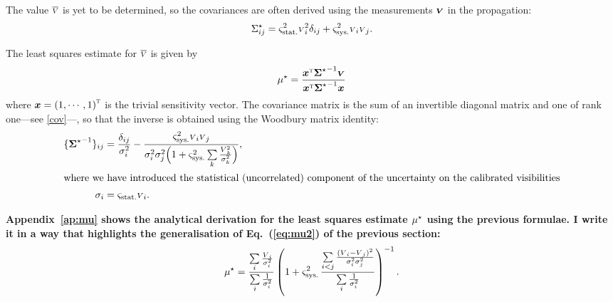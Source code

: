 \documentclass{pasa}
\def\correction#1{{\bfseries #1}}
\begin{document}
The value $\overline{{\scriptstyle V}}$ is yet to be determined, so the covariances are often derived using the measurements $\boldsymbol{{\scriptstyle V}}$ in the propagation:
\begin{equation}
    \Sigma_{ij}^\star = \varsigma_\text{stat.}^2 {\scriptstyle V}_i^2 \delta_{ij} 
            + \varsigma_\text{sys.}^2{\scriptstyle V}_i{\scriptstyle V}_j. \label{eq:cov}
\end{equation}

The least squares estimate for $\overline{{\scriptstyle V}}$ is given by
\begin{equation}
    \mu^\star =
                  \frac { {\boldsymbol{x}}^\text{\textsc{t}}{\ensuremath{\boldsymbol{\Sigma}}^\star}^{-1}\boldsymbol{{\scriptstyle V}} }
                        { {\boldsymbol{x}}^\text{\textsc{t}}{\ensuremath{\boldsymbol{\Sigma}}^\star}^{-1}\boldsymbol{x} }
    \label{eq:pppmod}
\end{equation}
where $\boldsymbol{x} = {(1, \cdots, 1)}^\text{\textsc{t}}$ is the trivial sensitivity vector.  The covariance matrix is the sum of an invertible diagonal matrix and one of rank one---see \eqref{cov}---, so that the inverse is obtained using the Woodbury matrix identity: 
\begin{align}
    \{ {\boldsymbol{\Sigma}^\star}^{-1} \}_{ij} &= \frac{\delta_{ij}}{\sigma_i^2}
         - \frac{\varsigma_\text{sys.}^2{\scriptstyle V}_i{\scriptstyle V}_j}
                {\sigma_i^2\sigma_j^2\Big(1 + 
            \varsigma_\text{sys.}^2\sum\limits_{k} \frac{{\scriptstyle V}_k^2}{\sigma_k^2}\Big)},
            \label{eq:invcov}\\
  \intertext{where we have introduced the statistical (uncorrelated) component of the uncertainty on the calibrated visibilities}
  \sigma_i     &= \varsigma_\text{stat.}{\scriptstyle V}_i \label{eq:devi}.
\end{align}

\correction{Appendix~\ref{ap:mu} shows the analytical derivation for the least squares estimate $\mu^\star$ using the previous formulae. I write it in a way that highlights the generalisation of Eq.~(\ref{eq:mu2}) of the previous section:}
\begin{equation}
  \mu^\star = 
    \frac{\sum\limits_{i} \frac{{\scriptstyle V}_i}{\sigma_i^2}}{\sum\limits_i \frac{1}{\sigma_i^2}}
    \left( 1 + \varsigma_\text{sys.}^2\,\frac
            {\sum\limits_{i<j} \frac{({\scriptstyle V}_i-{\scriptstyle V}_j)^2}{\sigma_i^2\sigma_j^2}} 
            {\sum\limits_i \frac{1}{\sigma_i^2}}
        \right)^{-1}.
    \label{eq:mu}
\end{equation}
\end{document}
